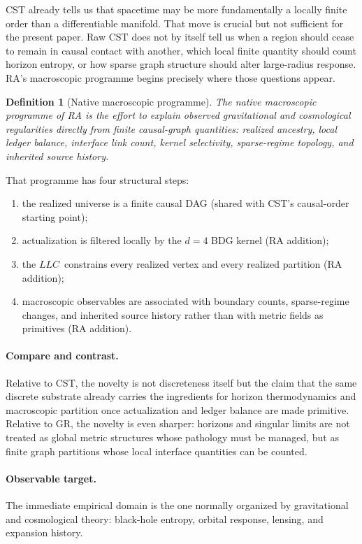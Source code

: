 \documentclass[11pt]{article}
\def\mathrm#1{#1}%
\newtheorem{definition}{Definition}
\newcommand{\LLC}{\ensuremath{\mathrm{LLC}}}
\begin{document}
CST already tells us that spacetime may be more fundamentally a locally finite order than a differentiable manifold. That move is crucial but not sufficient for the present paper. Raw CST does not by itself tell us when a region should cease to remain in causal contact with another, which local finite quantity should count horizon entropy, or how sparse graph structure should alter large-radius response. RA's macroscopic programme begins precisely where those questions appear.

\begin{definition}[Native macroscopic programme]
The \emph{native macroscopic programme} of RA is the effort to explain observed gravitational and cosmological regularities directly from finite causal-graph quantities: realized ancestry, local ledger balance, interface link count, kernel selectivity, sparse-regime topology, and inherited source history.
\end{definition}

That programme has four structural steps:
\begin{enumerate}[nosep]
    \item the realized universe is a finite causal DAG (shared with CST's causal-order starting point);
    \item actualization is filtered locally by the $d=4$ BDG kernel (RA addition);
    \item the \LLC\ constrains every realized vertex and every realized partition (RA addition);
    \item macroscopic observables are associated with boundary counts, sparse-regime changes, and inherited source history rather than with metric fields as primitives (RA addition).
\end{enumerate}

\paragraph{Compare and contrast.} Relative to CST, the novelty is not discreteness itself but the claim that the same discrete substrate already carries the ingredients for horizon thermodynamics and macroscopic partition once actualization and ledger balance are made primitive. Relative to GR, the novelty is even sharper: horizons and singular limits are not treated as global metric structures whose pathology must be managed, but as finite graph partitions whose local interface quantities can be counted.

\paragraph{Observable target.} The immediate empirical domain is the one normally organized by gravitational and cosmological theory: black-hole entropy, orbital response, lensing, and expansion history.
\end{document}
